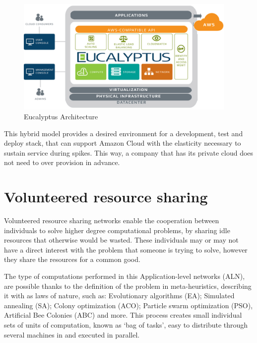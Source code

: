 \begin{figure}[h!]
  \centering
  \includegraphics[width=0.95\textwidth]{img/eucalyptus-architecture.png}
  \caption{Eucalyptus Architecture}
  \label{fig:eucalyptus}
\end{figure}

This hybrid model provides a desired environment for a development, test and deploy stack, that can support Amazon Cloud with the elasticity necessary to sustain service during spikes. This way, a company that has its private cloud does not need to over provision in advance.

% 
% 
\section{Volunteered resource sharing}

Volunteered resource sharing networks enable the cooperation between individuals to solve higher degree computational problems, by sharing idle resources that otherwise would be wasted. These individuals may or may not have a direct interest with the problem that someone is trying to solve, however they share the resources for a common good. 

The type of computations performed in this Application-level networks (ALN), are possible thanks to the definition of the problem in meta-heuristics, describing it with as laws of nature\cite{Duda2013}, such as: Evolutionary algorithms (EA); Simulated annealing (SA); Colony optimization (ACO); Particle swarm optimization (PSO), Artificial Bee Colonies (ABC) and more. This process creates small individual sets of units of computation, known as `bag of tasks', easy to distribute through several machines in and executed in parallel.
                  


